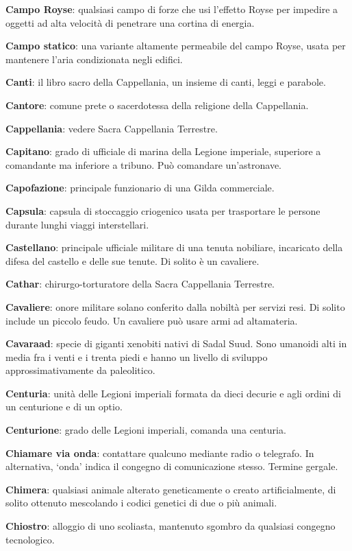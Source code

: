 \textbf{Campo Royse}: qualsiasi campo di forze che usi l'effetto Royse
per impedire a oggetti ad alta velocità di penetrare una cortina di
energia.

\textbf{Campo statico}: una variante altamente permeabile del campo
Royse, usata per mantenere l'aria condizionata negli edifici.

\textbf{Canti}: il libro sacro della Cappellania, un insieme di canti,
leggi e parabole.

\textbf{Cantore}: comune prete o sacerdotessa della religione della
Cappellania.

\textbf{Cappellania}: vedere Sacra Cappellania Terrestre.

\textbf{Capitano}: grado di ufficiale di marina della Legione imperiale,
superiore a comandante ma inferiore a tribuno. Può comandare
un'astronave.

\textbf{Capofazione}: principale funzionario di una Gilda commerciale.

\textbf{Capsula}: capsula di stoccaggio criogenico usata per trasportare
le persone durante lunghi viaggi interstellari.

\textbf{Castellano}: principale ufficiale militare di una tenuta
nobiliare, incaricato della difesa del castello e delle sue tenute. Di
solito è un cavaliere.

\textbf{Cathar}: chirurgo-torturatore della Sacra Cappellania Terrestre.

\textbf{Cavaliere}: onore militare solano conferito dalla nobiltà per
servizi resi. Di solito include un piccolo feudo. Un cavaliere può usare
armi ad altamateria.

\textbf{Cavaraad}: specie di giganti xenobiti nativi di Sadal Suud. Sono
umanoidi alti in media fra i venti e i trenta piedi e hanno un livello
di sviluppo approssimativamente da paleolitico.

\textbf{Centuria}: unità delle Legioni imperiali formata da dieci
decurie e agli ordini di un centurione e di un optio.

\textbf{Centurione}: grado delle Legioni imperiali, comanda una
centuria.

\textbf{Chiamare via onda}: contattare qualcuno mediante radio o
telegrafo. In alternativa, `onda' indica il congegno di comunicazione
stesso. Termine gergale.

\textbf{Chimera}: qualsiasi animale alterato geneticamente o creato
artificialmente, di solito ottenuto mescolando i codici genetici di due
o più animali.

\textbf{Chiostro}: alloggio di uno scoliasta, mantenuto sgombro da
qualsiasi congegno tecnologico.

